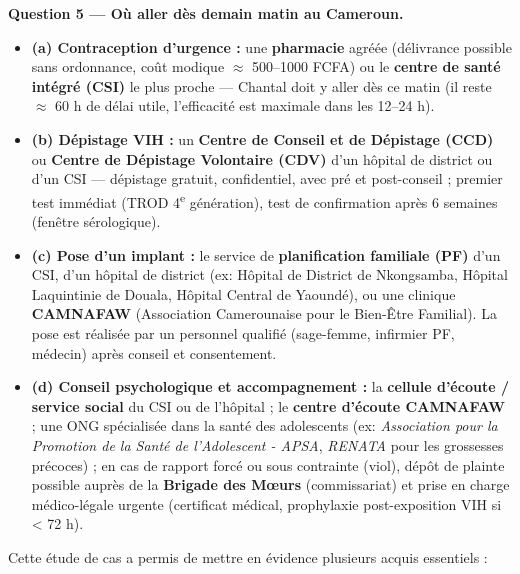 \documentclass[11pt]{article}
\newcounter{popsec}
\newcounter{popsub}
\newcommand{\courssub}[1]{%
  \stepcounter{popsub}%
  \par\vspace{9pt}\noindent{\popxbold\fontsize{11.5}{13}\selectfont\color{popink}{\color{poporange}\thepopsec.\thepopsub}\hspace{6pt}#1}\par\nopagebreak\vspace{4pt}
}
\begin{document}
\begin{exoresolu}
\textbf{Question 5 — Où aller dès demain matin au Cameroun.}

\begin{itemize}
\item \textbf{(a) Contraception d'urgence :} une \textbf{pharmacie} agréée (délivrance possible sans ordonnance, coût modique $\approx$ 500--1000 FCFA) ou le \textbf{centre de santé intégré (CSI)} le plus proche — Chantal doit y aller dès ce matin (il reste $\approx$ 60 h de délai utile, l'efficacité est maximale dans les 12--24 h).
\item \textbf{(b) Dépistage VIH :} un \textbf{Centre de Conseil et de Dépistage (CCD)} ou \textbf{Centre de Dépistage Volontaire (CDV)} d'un hôpital de district ou d'un CSI — dépistage gratuit, confidentiel, avec pré et post-conseil ; premier test immédiat (TROD 4\textsuperscript{e} génération), test de confirmation après 6 semaines (fenêtre sérologique).
\item \textbf{(c) Pose d'un implant :} le service de \textbf{planification familiale (PF)} d'un CSI, d'un hôpital de district (ex: Hôpital de District de Nkongsamba, Hôpital Laquintinie de Douala, Hôpital Central de Yaoundé), ou une clinique \textbf{CAMNAFAW} (Association Camerounaise pour le Bien-Être Familial). La pose est réalisée par un personnel qualifié (sage-femme, infirmier PF, médecin) après conseil et consentement.
\item \textbf{(d) Conseil psychologique et accompagnement :} la \textbf{cellule d'écoute / service social} du CSI ou de l'hôpital ; le \textbf{centre d'écoute CAMNAFAW} ; une ONG spécialisée dans la santé des adolescents (ex: \emph{Association pour la Promotion de la Santé de l'Adolescent - APSA}, \emph{RENATA} pour les grossesses précoces) ; en cas de rapport forcé ou sous contrainte (viol), dépôt de plainte possible auprès de la \textbf{Brigade des Mœurs} (commissariat) et prise en charge médico-légale urgente (certificat médical, prophylaxie post-exposition VIH si < 72 h).
\end{itemize}
\end{exoresolu}

\courssub{Bilan de l'activité}

Cette étude de cas a permis de mettre en évidence plusieurs acquis essentiels :
\end{document}
